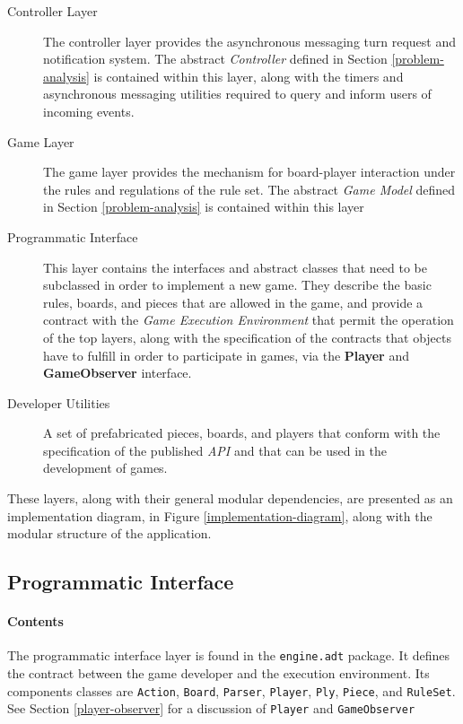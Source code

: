 	\begin{description}
		\item[Controller Layer] The controller layer provides the asynchronous messaging turn request
														and notification system. The abstract
														\emph{Controller} defined in Section \ref{problem-analysis} is contained 
														within this layer, along with the timers and asynchronous messaging utilities
														required to query and inform users of incoming events. %
		\item[Game Layer] The game layer provides the mechanism for board-player interaction under the
											rules and regulations of the rule set. The abstract \emph{Game Model} defined
											in Section \ref{problem-analysis} is contained within this layer
		\item[Programmatic Interface] This layer contains the interfaces and abstract classes that need to be subclassed 
											in order to implement a new game. They describe the basic rules, boards, and pieces
											that are allowed in the game, and provide a contract with the \emph{Game Execution 
											Environment} that permit the operation of the top layers, along with the specification 
											of the contracts that objects have to fulfill in order to participate in games, via the 
											\textbf{Player} and \textbf{GameObserver} interface.											
		\item[Developer Utilities] A set of prefabricated pieces, boards, and players that conform with the 
															 specification of the published \emph{API} and that can be used 
															 in the development of games. 
	\end{description}	
	
	
	These layers, along with their general modular dependencies, are presented as an implementation 		
	diagram, in Figure \ref{implementation-diagram}, along with the modular structure of the
	application.
	 	\subsection{Programmatic Interface}
	 		\paragraph{Contents}
		 		The programmatic interface layer is found in the \texttt{engine.adt} package. 
		 		It defines the contract between the game developer and the execution environment.
		 		Its components classes are \texttt{Action}, \texttt{Board}, \texttt{Parser}, 
		 		 \texttt{Player}, \texttt{Ply}, \texttt{Piece}, and \texttt{RuleSet}.  See Section 
		 		 \ref{player-observer} for a discussion of \texttt{Player} and \texttt{GameObserver}

